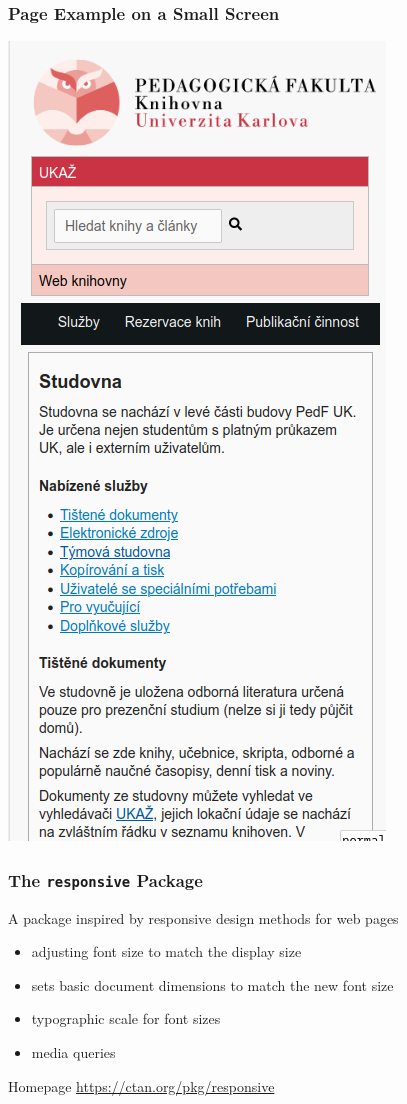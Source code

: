 \begin{frame}
  \frametitle{Page Example on a Small Screen}
  \begin{center}
    \includegraphics[height=.8\textheight]{img/pedf-web-small.png}
  \end{center}
\end{frame}

\begin{frame}
  \frametitle{The \texttt{responsive} Package}

  A package inspired by responsive design methods for web pages
  \begin{itemize}
  \item adjusting font size to match the display size
  \item sets basic document dimensions to match the new font size
  \item typographic scale for font sizes
  \item media queries
  \end{itemize}

  \bigskip

\begin{block}{Homepage}
  \url{https://ctan.org/pkg/responsive}
\end{block}
\end{frame}

